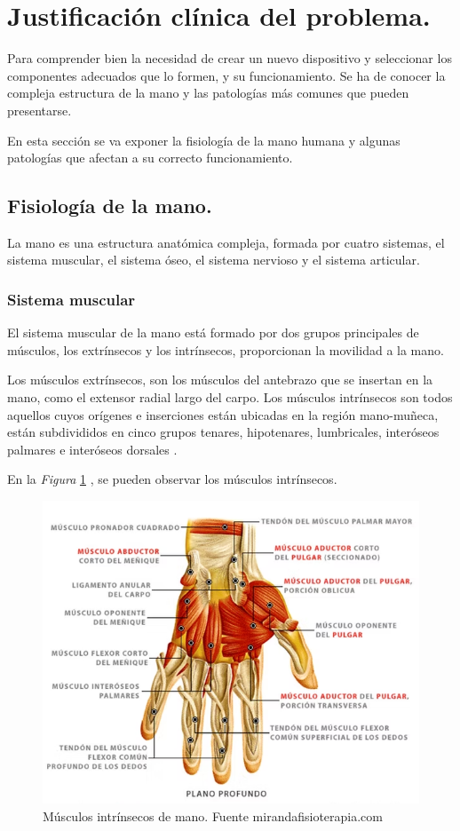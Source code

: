\section{Justificación clínica del problema.}

Para comprender bien la necesidad de crear un nuevo dispositivo y seleccionar los componentes adecuados que lo formen, y su funcionamiento. Se ha de conocer la compleja estructura de la mano y las  patologías más comunes que pueden presentarse. 

En esta sección se va exponer la fisiología de la mano humana y algunas patologías que afectan a su correcto funcionamiento.
\subsection{Fisiología de la mano.}

La mano es una estructura anatómica compleja, formada por cuatro sistemas, el sistema muscular, el sistema óseo, el sistema nervioso y el sistema articular. 

\subsubsection{Sistema muscular}

El sistema muscular de la mano está formado por dos grupos principales de músculos, los extrínsecos y los intrínsecos, proporcionan la movilidad a la mano. 

Los músculos extrínsecos, son los músculos del antebrazo que se insertan en la mano, como el extensor radial largo del carpo. Los músculos intrínsecos son todos aquellos cuyos orígenes e inserciones están ubicadas en la región mano-muñeca, están subdivididos en cinco grupos tenares, hipotenares, lumbricales, interóseos palmares e interóseos dorsales .\cite{mano_anatomía}

En la \textit{Figura} \ref{fig:Músculos_mano} , se pueden observar los músculos intrínsecos.
\begin{figure}
    \centering
    \includegraphics[width=0.5\linewidth]{img/Musculos_mano.png}
    \caption{Músculos intrínsecos de mano. Fuente mirandafisioterapia.com}
    \label{fig:Músculos_mano}
\end{figure}



